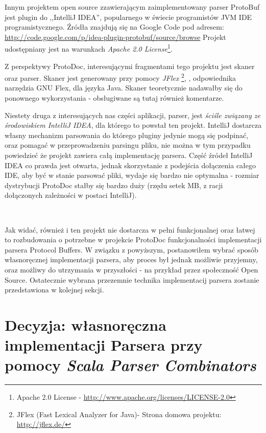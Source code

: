 \documentclass[pdflatex,11pt]{aghdpl}
\begin{document}
Innym projektem open source zzawierającym zaimplementowany parser ProtoBuf jest plugin do ,,IntelliJ IDEA'', popularnego w świecie programistów JVM 
IDE programistycznego. Źródła znajdują się na Google Code pod adresem: \href{http://code.google.com/p/idea-plugin-protobuf/source/browse}{http://code.google.com/p/idea-plugin-protobuf/source/browse}
Projekt udostępniany jest na warunkach \textit{Apache 2.0 License}\footnote{Apache 2.0 License - \href{http://www.apache.org/licenses/LICENSE-2.0}{http://www.apache.org/licenses/LICENSE-2.0}}.

Z perspektywy ProtoDoc, interesującymi fragmentami tego projektu jest skaner oraz parser. 
Skaner jest generowany przy pomocy \textit{JFlex} \footnote{JFlex (Fast Lexical Analyzer for Java)- Strona domowa projektu: \href{http://jflex.de/}{http://jflex.de/}},
, odpowiednika narzędzia GNU Flex, dla języka Java. Skaner teoretycznie nadawałby się do ponownego wykorzystania - obsługiwane są tutaj również komentarze.

Niestety druga z interesujących nas części aplikacji, parser, jest \textit{ściśle związany ze środowiskiem IntelliJ IDEA}, dla którego to powstał ten projekt.
IntelliJ dostarcza własny mechanizm parsowania do którego pluginy jedynie mogą się podpinać, oraz pomagać w przeprowadzeniu parsingu pliku, nie można w tym przypadku
powiedzieć że projekt zawiera całą implementację parsera. Część źródeł IntelliJ IDEA co prawda jest otwarta, jednak skorzystanie z podejścia dołączenia całego IDE,
aby być w stanie parsować pliki, wydaje się bardzo nie optymalna - rozmiar dystrybucji ProtoDoc stałby się bardzo duży (rzędu setek MB, z racji dołączonych 
zależności w postaci IntelliJ).

~\\\*

Jak widać, również i ten projekt nie dostarcza w pełni funkcjonalnej oraz łatwej to rozbudowania o potrzebne w projekcie ProtoDoc funkcjonalności implementacji parsera
Protocol Buffers. W związku z powyższym, postanowiłem wybrać sposób własnoręcznej implementacji parsera, aby proces był jednak możliwie przyjemny, oraz
możliwy do utrzymania w przyszłości - na przykład przez społeczność Open Source. Ostatecznie wybrana przezemnie technika implementacij parsera 
zostanie przedstawiona w kolejnej sekcji.



\section{Decyzja: własnoręczna implementacji Parsera przy pomocy \textit{Scala Parser Combinators}}
\label{sec:wybor_parsera}
\end{document}

